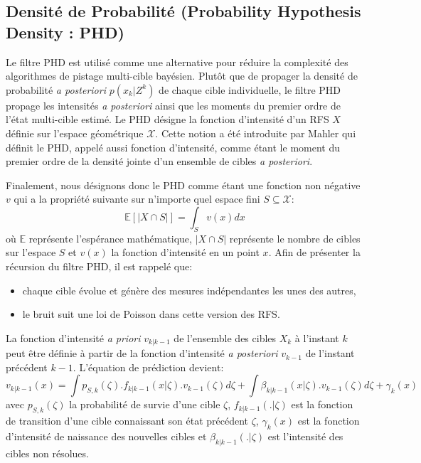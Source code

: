 \documentclass[10pt,french,a4paper]{report}
\begin{document}
\subsection{Densité de Probabilité (Probability Hypothesis Density : PHD)}
\label{p3}
Le filtre \acf{PHD} est utilisé comme une alternative pour réduire la complexité des algorithmes de pistage multi-cible bayésien. Plutôt que de propager la densité de probabilité \textit{a posteriori} $p(x_k|Z^k)$ de chaque cible individuelle, le filtre \acf{PHD} propage les intensités \textit{a posteriori} ainsi que les moments du premier ordre de l'état multi-cible estimé. Le \ac{PHD} désigne la fonction d'intensité d'un \ac{RFS} $X$ définie sur l'espace géométrique $\mathcal{X}$. Cette notion a été introduite par Mahler \cite{Mahler03} qui définit le PHD, appelé aussi fonction d'intensité, comme étant le moment du premier ordre de la densité jointe d'un ensemble de cibles \textit{a posteriori}. 

Finalement, nous désignons donc le \ac{PHD} comme étant une fonction non négative $v$ qui a la propriété suivante sur n'importe quel espace fini $S\subseteq\mathcal{X}$:
\begin{equation}
 \mathbb{E}[|X\cap S|]=\int_Sv(x)dx
\end{equation}
où $\mathbb{E}$ représente l'espérance mathématique, $|X\cap S|$ représente le nombre de cibles sur l'espace $S$ et $v(x)$ la fonction d'intensité en un point $x$.
Afin de présenter la récursion du filtre \ac{PHD}, il est rappelé que:
 \begin{itemize}
\item chaque cible évolue et génère des mesures indépendantes les unes des autres,
\item le bruit suit une loi de Poisson dans cette version des \ac{RFS}.
\end{itemize}

La fonction d'intensité \textit{a priori} $v_{k|k-1}$ de l'ensemble des cibles $X_k$ à l'instant $k$ peut être définie à partir de la fonction d'intensité \textit{a posteriori} $v_{k-1}$ de l'instant précédent $k-1$. L'équation de prédiction devient:  
\begin{equation}
 v_{k|k-1}(x)= \int p_{S,k}(\zeta).f_{k|k-1}(x|\zeta).v_{k-1}(\zeta)d\zeta + \int \beta_{k|k-1}(x|\zeta).v_{k-1}(\zeta)d\zeta + \gamma_k(x)
 \label{RFSpredit}
\end{equation}
avec $p_{S,k}(\zeta)$ la probabilité de survie d'une cible $\zeta$, $f_{k|k-1}(.|\zeta)$ est la fonction de transition d'une cible connaissant son état précédent $\zeta$, $\gamma_k(x)$ est la fonction d'intensité de naissance des nouvelles cibles et $\beta_{k|k-1}(.|\zeta)$ est l'intensité des cibles non résolues.
\end{document}
